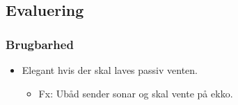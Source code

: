 \documentclass[t]{beamer}
\begin{document}
\subsection{Evaluering}

\begin{frame}
  \frametitle{Brugbarhed}
  
  \begin{itemize}
  \item Elegant hvis der skal laves passiv venten.
    \begin{itemize}
    \item Fx: Ubåd sender sonar og skal vente på ekko.
    \end{itemize}
  \end{itemize}
\end{frame}
\end{document}
